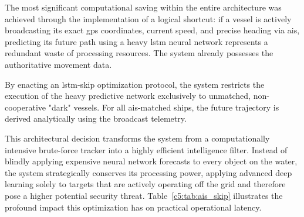 The most significant computational saving within the entire architecture was achieved through the implementation of a logical shortcut: if a vessel is actively broadcasting its exact \gls{gps} coordinates, current speed, and precise heading via \gls{ais}, predicting its future path using a heavy \gls{lstm} neural network represents a redundant waste of processing resources. The system already possesses the authoritative movement data.

By enacting an \gls{lstm}-skip optimization protocol, the system restricts the execution of the heavy predictive network exclusively to unmatched, non-cooperative "dark" vessels. For all \gls{ais}-matched ships, the future trajectory is derived analytically using the broadcast telemetry. 

This architectural decision transforms the system from a computationally intensive brute-force tracker into a highly efficient intelligence filter. Instead of blindly applying expensive neural network forecasts to every object on the water, the system strategically conserves its processing power, applying advanced deep learning solely to targets that are actively operating off the grid and therefore pose a higher potential security threat. Table~\ref{c5:tab:ais_skip} illustrates the profound impact this optimization has on practical operational latency.

\begin{table}[H]
\fontsize{10}{12}\selectfont
\centering
\caption{Measured Compute Saving from \gls{ais}-Matched \gls{lstm} Skip Optimization (6 vessels/frame, 300 iterations)}
\label{c5:tab:ais_skip}

\end{table}

